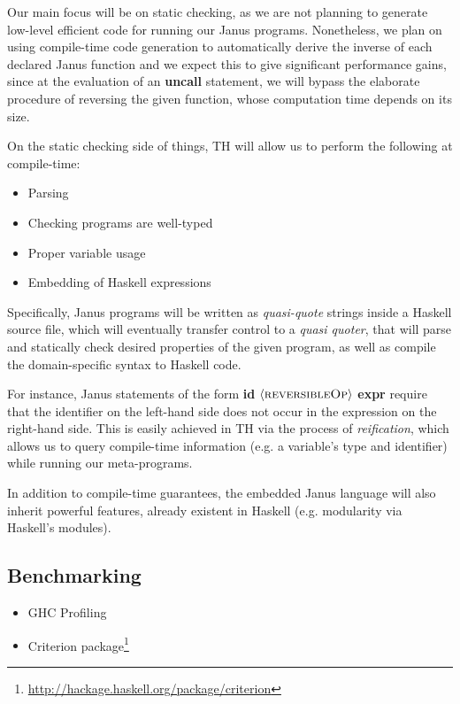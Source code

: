 \documentclass[12pt,a4paper]{article}
\newcommand{\site}[1]{\footnote{\url{#1}}}
\begin{document}
Our main focus will be on static checking, as we are not planning to generate low-level efficient code for running our Janus programs. Nonetheless, we plan on using compile-time code generation to automatically derive the inverse of each declared Janus function and we expect this to give significant performance gains, since at the evaluation of an \textbf{uncall} statement, we will bypass the elaborate procedure of reversing the given function, whose computation time depends on its size.

On the static checking side of things, TH will allow us to perform the following at compile-time:
\begin{itemize}
	\item{Parsing}
	\item{Checking programs are well-typed}
	\item{Proper variable usage}
	\item{Embedding of Haskell expressions}
\end{itemize}

Specifically, Janus programs will be written as \textit{quasi-quote} strings inside a Haskell source file, which will eventually transfer control to a \textit{quasi quoter}, that will parse and statically check desired properties of the given program, as well as compile the domain-specific syntax to Haskell code.

For instance, Janus statements of the form \textbf{id} $\langle\textsc{reversibleOp}\rangle$ \textbf{expr} require that the identifier on the left-hand side does not occur in the expression on the right-hand side. This is easily achieved in TH via the process of \textit{reification}, which allows us to query compile-time information (e.g. a variable's type and identifier) while running our meta-programs.

In addition to compile-time guarantees, the embedded Janus language will also inherit powerful features, already existent in Haskell (e.g. modularity via Haskell's modules).
	
\subsection{Benchmarking}
	\begin{itemize}
		\item{GHC Profiling}
		\item{Criterion package\site{http://hackage.haskell.org/package/criterion}}
	\end{itemize}
\end{document}
